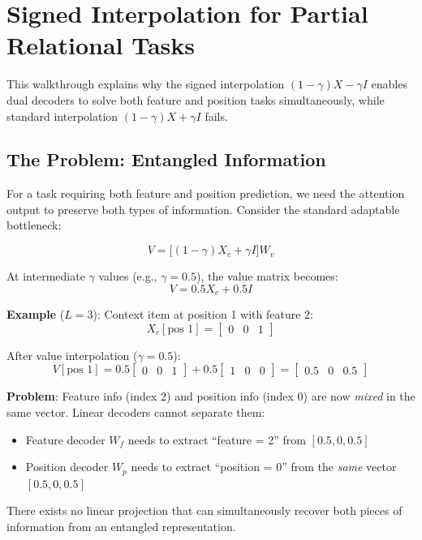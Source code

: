 \documentclass[12pt]{article}
\begin{document}
\section*{Signed Interpolation for Partial Relational Tasks}

This walkthrough explains why the signed interpolation $(1-\gamma)X - \gamma I$ enables dual decoders to solve both feature and position tasks simultaneously, while standard interpolation $(1-\gamma)X + \gamma I$ fails.

\subsection*{The Problem: Entangled Information}

For a task requiring both feature and position prediction, we need the attention output to preserve both types of information. Consider the standard adaptable bottleneck:

\[
V = \bigl[(1-\gamma)X_c + \gamma I\bigr]W_v
\]

At intermediate $\gamma$ values (e.g., $\gamma = 0.5$), the value matrix becomes:
\[
V = 0.5 X_c + 0.5 I
\]

\textbf{Example} ($L=3$): Context item at position 1 with feature 2:
\[
X_c[\text{pos 1}] = \begin{bmatrix} 0 & 0 & 1 \end{bmatrix}
\]

After value interpolation ($\gamma=0.5$):
\[
V[\text{pos 1}] = 0.5 \begin{bmatrix} 0 & 0 & 1 \end{bmatrix} + 0.5 \begin{bmatrix} 1 & 0 & 0 \end{bmatrix}
= \begin{bmatrix} 0.5 & 0 & 0.5 \end{bmatrix}
\]

\textbf{Problem}: Feature info (index 2) and position info (index 0) are now \emph{mixed} in the same vector. Linear decoders cannot separate them:
\begin{itemize}
    \item Feature decoder $W_f$ needs to extract ``feature = 2'' from $[0.5, 0, 0.5]$
    \item Position decoder $W_p$ needs to extract ``position = 0'' from the \emph{same} vector $[0.5, 0, 0.5]$
\end{itemize}

There exists no linear projection that can simultaneously recover both pieces of information from an entangled representation.
\end{document}

